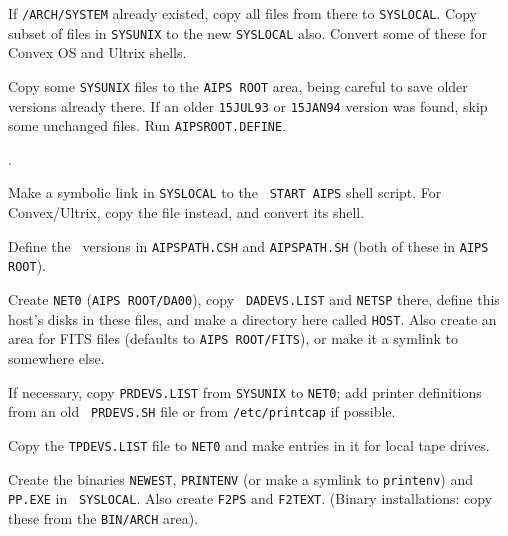 \item\bul If {\tt\thisver/\dol ARCH/SYSTEM} already
        existed, copy all files from there to {\tt\dol SYSLOCAL}.  Copy
        subset of files in {\tt\dol SYSUNIX} to the new {\tt\dol SYSLOCAL}
        also.  Convert some of these for Convex OS and Ultrix shells.

\item\bul Copy some {\tt\dol SYSUNIX} files to the {\tt\dol AIPS ROOT}
        area, being careful to save older versions already there.  If an older
        {\tt 15JUL93} or {\tt 15JAN94} version was found, skip some
        unchanged files.  Run {\tt AIPSROOT.DEFINE}.

\item{}.

\item\bul Make a symbolic link in {\tt\dol SYSLOCAL} to the {\tt
        START AIPS} shell script.  For Convex/Ultrix, copy the file
        instead, and convert its shell.

\item\bul Define the \AIPS\ versions in {\tt AIPSPATH.CSH} and
        {\tt AIPSPATH.SH} (both of these in {\tt\dol AIPS ROOT}).

\item\bul Create {\tt\dol NET0} ({\tt\dol AIPS ROOT/DA00}), copy {\tt
        DADEVS.LIST} and {\tt NETSP} there, define this host's disks
        in these files, and make a directory here called {\tt\dol HOST}.
        Also create an area for FITS files (defaults to
        {\tt \dol AIPS ROOT/FITS}), or make it a symlink to somewhere
        else.

\item\bul If necessary, copy {\tt PRDEVS.LIST} from {\tt SYSUNIX}
        to {\tt \dol NET0}; add printer definitions from an old {\tt
        PR\-DEVS.SH} file or from {\tt /etc/printcap} if possible.

\item\bul Copy the {\tt TPDEVS.LIST} file to {\tt\dol NET0} and make
        entries in it for local tape drives.

\item\bul Create the binaries {\tt NEWEST}, {\tt PRINTENV} (or make
        a symlink to {\tt printenv}) and {\tt PP.EXE} in {\tt\dol
        SYSLOCAL}.  Also create {\tt F2PS} and {\tt F2TEXT}.  (Binary
        installations: copy these from the {\tt BIN/\dol ARCH} area).

